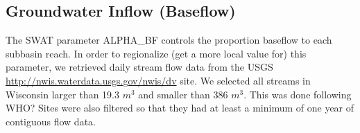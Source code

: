\subsection{Groundwater Inflow (Baseflow)}
	The SWAT parameter ALPHA\_BF controls the proportion baseflow to each subbasin reach. In order to regionalize (get a more local value for) this parameter, we retrieved daily stream flow data from the USGS \href{NWIS}{http://nwis.waterdata.usgs.gov/nwis/dv} site. We selected all streams in Wisconsin larger than 19.3 $m^3$ and smaller than 386 $m^3$. This was done following WHO? Sites were also filtered so that they had at least a minimum of one year of contiguous flow data. 

